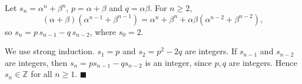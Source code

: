 Let $s_n=\alpha^n+\beta^n$, $p=\alpha+\beta$ and $q=\alpha\beta$. For $n\ge2$,
\[(\alpha+\beta)\left(\alpha^{n-1}+\beta^{n-1}\right)=\alpha^n+\beta^n+\alpha\beta\left(\alpha^{n-2}+\beta^{n-2}\right),\]
so $s_n=p\,s_{n-1}-q\,s_{n-2}$, where $s_0=2$.

We use strong induction. $s_1=p$ and $s_2=p^2-2q$ are integers. If $s_{n-1}$ and $s_{n-2}$ are integers, then $s_n=ps_{n-1}-qs_{n-2}$ is an integer, since $p,q$ are integers. Hence $s_n\in\mathbb Z$ for all $n\ge1$. $\blacksquare$
